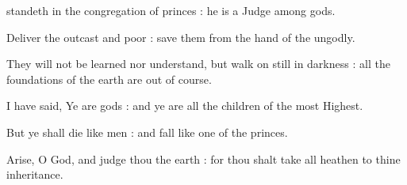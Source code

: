 
 standeth in the congregation of princes : he is a Judge among gods.\par
{}
Deliver the outcast and poor : save them from the hand of the ungodly.\par
{}They will not be learned nor understand, but walk on still in darkness : all the foundations of the earth are out of course.\par
{}I have said, Ye are gods : and ye are all the children of the most Highest.\par
{}But ye shall die like men : and fall like one of the princes.\par
{}Arise, O God, and judge thou the earth : for thou shalt take all heathen to thine inheritance.\par



